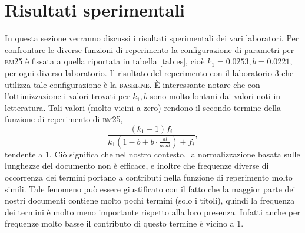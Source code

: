 \section{Risultati sperimentali}
\label{sec:risult-sper}

In questa sezione verranno discussi i risultati sperimentali dei vari laboratori. Per confrontare le diverse funzioni di reperimento la configurazione di parametri per \textsc{bm25} \`e fissata a quella riportata in tabella \ref{tab:es}, cio\`e $k_1 = 0.0253, b = 0.0221$, per ogni diverso laboratorio. Il risultato del reperimento con il laboratorio 3 che utilizza tale configurazione \`e la \textsc{baseline}.
\`E interessante notare che con l'ottimizzazione i valori trovati per $k_1, b$ sono molto lontani dai valori noti in letteratura. Tali valori (molto vicini a zero) rendono il secondo termine della funzione di reperimento di \textsc{bm25}, 
\[\frac{(k_1 + 1)f_i}{k_1(1-b+b \cdot \frac{dl}{avdl})+f_i},\] 
tendente a $1$. Ci\`o significa che nel nostro contesto, la normalizzazione basata sulle lunghezze del documento non \`e efficace, e inoltre che frequenze diverse di occorrenza dei termini portano a contributi nella funzione di reperimento molto simili. Tale fenomeno pu\`o essere giustificato con il fatto che la maggior parte dei nostri documenti contiene molto pochi termini (solo i titoli), quindi la frequenza dei termini \`e molto meno importante rispetto alla loro presenza. Infatti anche per frequenze molto basse il contributo di questo termine \`e vicino a 1.

